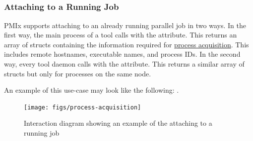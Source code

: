 
 \\
 \\
 \\
 \\

\subsubsection{Attaching to a Running Job}

PMIx supports attaching to an already running parallel job in two ways. In the first way, the main process of a tool calls  with the  attribute. This returns an array of structs containing the information required for \hyperref[subsubsec:process-acq]{process acquisition}. This includes remote hostnames, executable names, and process IDs. In the second way, every tool daemon calls  with the  attribute. This returns a similar array of structs but only for processes on the same node.

An example of this use-case may look like the following: .

\begingroup
\begin{figure}
  \begin{center}
    \texttt{[image: figs/process-acquisition]}
  \end{center}
  \caption{Interaction diagram showing an example of the attaching to a running job}
  \label{fig:proc_acq}
\end{figure}
\endgroup

{\large {}}

{\large {}}

{\large {}}

{\large {}}



